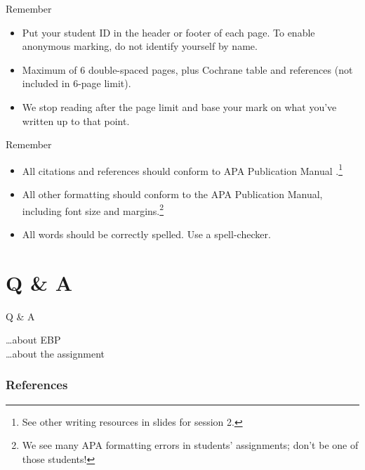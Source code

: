 \documentclass{beamer}
\begin{document}
% 
\begin{frame}{\Pointinghand \hspace{0.05cm} Remember}
	\begin{itemize}
	\item[\checked] Put your student ID in the header or footer of each page. To enable anonymous marking, do \alert{not} identify yourself by name.
	\item[\checked] \alert{Maximum} of 6 double-spaced pages, \alert{plus} Cochrane table and references (not included in 6-page limit).
	\item[\checked] We stop reading after the page limit and base your mark on what you've written up to that point.	
	\end{itemize}
\end{frame}

% 
\begin{frame}{\Pointinghand \hspace{0.05cm} Remember}
	\begin{itemize}
	\item[\checked] All citations and references should conform to APA Publication Manual \citep{AmericanPsychologicalAssociation2010}.\footnote{See other writing resources in slides for session 2.}
	\item[\checked] All other formatting should conform to the APA Publication Manual, \alert{including font size and margins}.\footnote{We see many APA formatting errors in students' assignments; don't be one of those students!}
	\item[\checked] All words should be correctly spelled. Use a spell-checker.
	\end{itemize}
\end{frame}

\section{Q \& A}

% 
\begin{frame}{Q \& A}
	\begin{center}
	\dots about EBP \\
	\vspace{0.2in}
	\dots about the assignment
	\end{center}
\end{frame}

%
\begin{frame}%
	\frametitle{References}
	
	\small
\end{frame}
\end{document}
